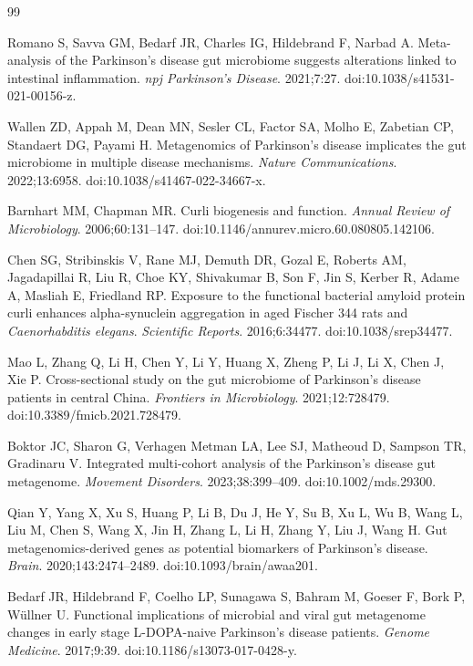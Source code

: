 \documentclass[12pt]{article}
\begin{document}
\begin{thebibliography}{99}

Romano S, Savva GM, Bedarf JR, Charles IG, Hildebrand F, Narbad A.
Meta-analysis of the Parkinson's disease gut microbiome suggests alterations linked to intestinal inflammation.
\textit{npj Parkinson's Disease}. 2021;7:27. doi:10.1038/s41531-021-00156-z.

Wallen ZD, Appah M, Dean MN, Sesler CL, Factor SA, Molho E, Zabetian CP, Standaert DG, Payami H.
Metagenomics of Parkinson's disease implicates the gut microbiome in multiple disease mechanisms.
\textit{Nature Communications}. 2022;13:6958. doi:10.1038/s41467-022-34667-x.

Barnhart MM, Chapman MR.
Curli biogenesis and function.
\textit{Annual Review of Microbiology}. 2006;60:131--147. doi:10.1146/annurev.micro.60.080805.142106.

Chen SG, Stribinskis V, Rane MJ, Demuth DR, Gozal E, Roberts AM, Jagadapillai R, Liu R, Choe KY, Shivakumar B, Son F, Jin S, Kerber R, Adame A, Masliah E, Friedland RP.
Exposure to the functional bacterial amyloid protein curli enhances alpha-synuclein aggregation in aged Fischer 344 rats and \textit{Caenorhabditis elegans}.
\textit{Scientific Reports}. 2016;6:34477. doi:10.1038/srep34477.

Mao L, Zhang Q, Li H, Chen Y, Li Y, Huang X, Zheng P, Li J, Li X, Chen J, Xie P.
Cross-sectional study on the gut microbiome of Parkinson's disease patients in central China.
\textit{Frontiers in Microbiology}. 2021;12:728479. doi:10.3389/fmicb.2021.728479.

Boktor JC, Sharon G, Verhagen Metman LA, Lee SJ, Matheoud D, Sampson TR, Gradinaru V.
Integrated multi-cohort analysis of the Parkinson's disease gut metagenome.
\textit{Movement Disorders}. 2023;38:399--409. doi:10.1002/mds.29300.

Qian Y, Yang X, Xu S, Huang P, Li B, Du J, He Y, Su B, Xu L, Wu B, Wang L, Liu M, Chen S, Wang X, Jin H, Zhang L, Li H, Zhang Y, Liu J, Wang H.
Gut metagenomics-derived genes as potential biomarkers of Parkinson's disease.
\textit{Brain}. 2020;143:2474--2489. doi:10.1093/brain/awaa201.

Bedarf JR, Hildebrand F, Coelho LP, Sunagawa S, Bahram M, Goeser F, Bork P, W\"ullner U.
Functional implications of microbial and viral gut metagenome changes in early stage L-DOPA-naive Parkinson's disease patients.
\textit{Genome Medicine}. 2017;9:39. doi:10.1186/s13073-017-0428-y.

\end{thebibliography}
\end{document}
